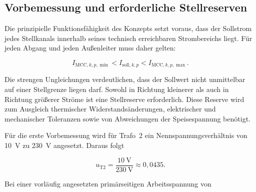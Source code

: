 \begin{center}
\end{center}



\subsection{Vorbemessung und erforderliche Stellreserven}
\label{sec:dimensionierung_stellreserve}

Die prinzipielle Funktionsfähigkeit des Konzepts setzt voraus, dass
der Sollstrom jedes Stellkanals innerhalb seines technisch
erreichbaren Strombereichs liegt. Für jeden Abgang und jeden
Außenleiter muss daher gelten:

\begin{equation}
    I_{\mathrm{MCC},k,p,\min}
    <
    I_{\mathrm{soll},k,p}
    <
    I_{\mathrm{MCC},k,p,\max}.
    \label{eq:erreichbarer_strombereich_stellkanal}
\end{equation}

Die strengen Ungleichungen verdeutlichen, dass der Sollwert nicht
unmittelbar auf einer Stellgrenze liegen darf. Sowohl in Richtung
kleinerer als auch in Richtung größerer Ströme ist eine Stellreserve
erforderlich. Diese Reserve wird zum Ausgleich thermischer
Widerstandsänderungen, elektrischer und mechanischer Toleranzen sowie
von Abweichungen der Speisespannung benötigt.

Für die erste Vorbemessung wird für Trafo~2 ein
Nennspannungsverhältnis von \SI{10}{\volt} zu
\SI{230}{\volt} angesetzt. Daraus folgt

\begin{equation}
    u_{\mathrm{T2}}
    =
    \frac{\SI{10}{\volt}}{\SI{230}{\volt}}
    \approx
    0{,}0435.
    \label{eq:vorbemessung_uebersetzung_trafo2}
\end{equation}

Bei einer vorläufig angesetzten primärseitigen Arbeitsspannung von

